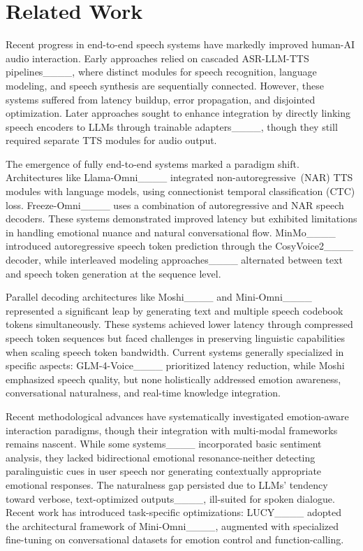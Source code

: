 \section{Related Work}
\noindent Recent progress in end-to-end speech systems have markedly improved human-AI audio interaction. Early approaches relied on cascaded ASR-LLM-TTS pipelines____, where distinct modules for speech recognition, language modeling, and speech synthesis are sequentially connected. However, these systems suffered from latency buildup, error propagation, and disjointed optimization. Later approaches sought to enhance integration by directly linking speech encoders to LLMs through trainable adapters____, though they still required separate TTS modules for audio output. 

\bigskip
\noindent The emergence of fully end-to-end systems marked a paradigm shift. Architectures like Llama-Omni____ integrated non-autoregressive~(NAR) TTS modules with language models, using connectionist temporal classification (CTC) loss. Freeze-Omni____ uses a combination of autoregressive and NAR speech decoders. These systems demonstrated improved latency but exhibited limitations in handling emotional nuance and natural conversational flow. MinMo____ introduced autoregressive speech token prediction through the CosyVoice2____ decoder, while interleaved modeling approaches____ alternated between text and speech token generation at the sequence level.

\bigskip
\noindent Parallel decoding architectures like Moshi____ and Mini-Omni____ represented a significant leap by generating text and multiple speech codebook tokens simultaneously. These systems achieved lower latency through compressed speech token sequences but faced challenges in preserving linguistic capabilities when scaling speech token bandwidth. Current systems generally specialized in specific aspects: GLM-4-Voice____ prioritized latency reduction, while Moshi emphasized speech quality, but none holistically addressed emotion awareness, conversational naturalness, and real-time knowledge integration.

\bigskip
\noindent Recent methodological advances have systematically investigated emotion-aware interaction paradigms, though their integration with multi-modal frameworks remains nascent. While some systems____ incorporated basic sentiment analysis, they lacked bidirectional emotional resonance-neither detecting paralinguistic cues in user speech nor generating contextually appropriate emotional responses. The naturalness gap persisted due to LLMs' tendency toward verbose, text-optimized outputs____, ill-suited for spoken dialogue. Recent work has introduced task-specific optimizations: LUCY____ adopted the architectural framework of Mini-Omni____, augmented with specialized fine-tuning on conversational datasets for emotion control and function-calling.

